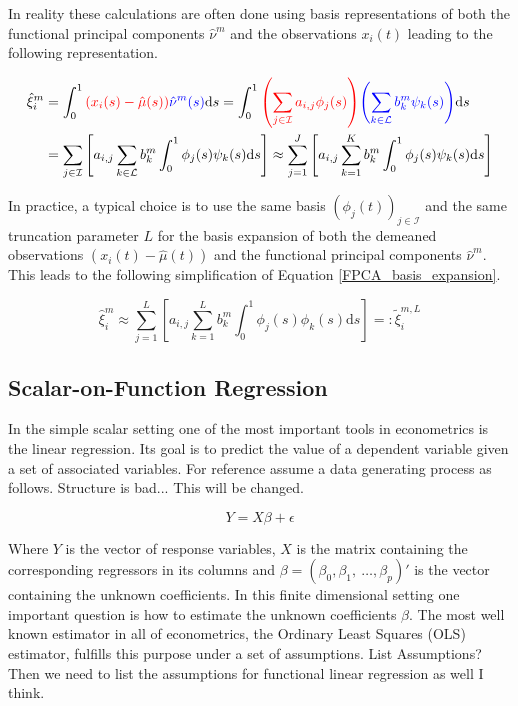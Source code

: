 \documentclass[11pt,twoside,a4paper]{article}
\begin{document}
	In reality these calculations are often done using basis representations of both the functional principal components $\hat{\nu}^m$ and the observations $x_i(t)$ leading to the following representation.
	
	\begin{equation}\label{FPCA_basis_expansion}
		\begin{split}
			\hat{\xi}_{i}^m & = \int_{0}^{1} {\color{red}\left( x_i(s) - \hat{\mu}(s)\right)} {\color{blue}\hat{\nu}^m(s)} \mathrm{d}s
			= \int_{0}^{1} {\color{red}\left(\sum_{j \in \mathcal{I}} a_{i,j} \phi_j(s)\right)} {\color{blue}\left(\sum_{k \in \mathcal{L}} b_{k}^m \psi_{k}(s)\right)} \mathrm{d}s \\
			& = \sum_{j \in \mathcal{I}} \left[ a_{i,j}\sum_{k \in \mathcal{L}} b_{k}^m \int_{0}^{1} \phi_j(s) \psi_{k}(s)\mathrm{d}s\right] \approx \sum_{j = 1}^{J} \left[a_{i,j}\sum_{k = 1}^{K} b_{k}^m \int_{0}^{1} \phi_j(s) \psi_{k}(s)\mathrm{d}s \right]
		\end{split}
	\end{equation}
	
	In practice, a typical choice is to use the same basis $\left(\phi_j(t)\right)_{j \in \mathcal{I}}$ and the same truncation parameter $L$ for the basis expansion of both the demeaned observations $\left(x_i(t) - \hat{\mu}(t)\right)$ and the functional principal components $\hat{\nu}^m$. This leads to the following simplification of Equation \ref{FPCA_basis_expansion}.
	
	\begin{equation}
		\hat{\xi}_{i}^m \approx \sum_{j = 1}^{L} \left[ a_{i,j}\sum_{k = 1}^{L} b_{k}^m \int_{0}^{1} \phi_j(s) \phi_{k}(s)\mathrm{d}s\right] =: \tilde{\xi}^{m,L}_{i}
	\end{equation}
	
	\subsection{Scalar-on-Function Regression}
	In the simple scalar setting one of the most important tools in econometrics is the linear regression. Its goal is to predict the value of a dependent variable given a set of associated variables. For reference assume a data generating process as follows. {\color{red} Structure is bad... This will be changed.}
	
	\begin{equation}
		Y = X\beta + \epsilon
	\end{equation}
	
	Where $Y$ is the vector of response variables, $X$ is the matrix containing the corresponding regressors in its columns and $\beta = (\beta_0, \beta_1, \: \dots, \beta_p)'$ is the vector containing the unknown coefficients.
	In this finite dimensional setting one important question is how to estimate the unknown coefficients $\beta$. The most well known estimator in all of econometrics, the Ordinary Least Squares (OLS) estimator, fulfills this purpose under a set of assumptions. {\color{red}List Assumptions? Then we need to list the assumptions for functional linear regression as well I think.}
	
\end{document}
